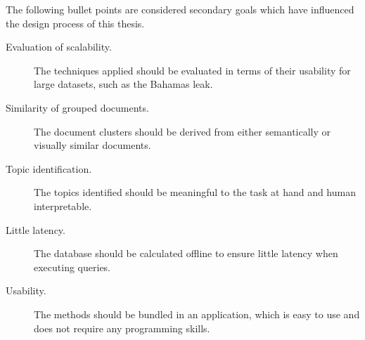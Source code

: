 The following bullet points are considered secondary goals which have influenced the design process of this thesis.
\begin{description}
    \item[Evaluation of scalability.]
    The techniques applied should be evaluated in terms of their usability for large datasets, such as the Bahamas leak.
    \item[Similarity of grouped documents.]
    The document clusters should be derived from either semantically or visually similar documents.
    \item[Topic identification.]
    The topics identified should be meaningful to the task at hand and human interpretable.  
    \item[Little latency.]
    The database should be calculated offline to ensure little latency when executing queries.
    \item[Usability.]
    The methods should be bundled in an application, which is easy to use and does not require any programming skills.
\end{description}